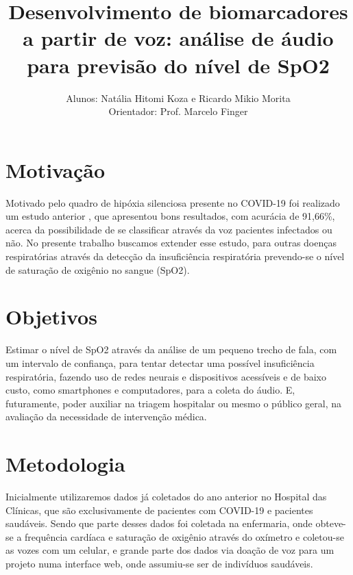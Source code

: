 \documentclass[12pt, a4paper]{article}
\begin{document}
\title{Desenvolvimento de biomarcadores a partir de voz: análise de áudio para previsão do nível de SpO2}

\author{Alunos: Natália Hitomi Koza e Ricardo Mikio Morita \\ Orientador: Prof. Marcelo Finger}
\maketitle

\section{Motivação}

Motivado pelo quadro de hipóxia silenciosa presente no COVID-19 foi realizado um estudo anterior \citep{casanova2021deep}, que apresentou bons resultados, com acurácia de 91,66\%, acerca da possibilidade de se classificar através da voz pacientes infectados ou não. No presente trabalho buscamos extender esse estudo, para outras doenças respiratórias através da detecção da insuficiência respiratória prevendo-se o nível de saturação de oxigênio no sangue (SpO2).


\section{Objetivos}

Estimar o nível de SpO2 através da análise de um pequeno trecho de fala, com um intervalo de confiança, para tentar detectar uma possível insuficiência respiratória, fazendo uso de redes neurais e dispositivos acessíveis e de baixo custo, como smartphones e computadores, para a coleta do áudio. E, futuramente, poder auxiliar na triagem hospitalar ou mesmo o público geral, na avaliação da necessidade de intervenção médica.

\section{Metodologia}

Inicialmente utilizaremos dados já coletados do ano anterior no Hospital das Clínicas, que são exclusivamente de pacientes com COVID-19 e pacientes saudáveis. Sendo que parte desses dados foi coletada na enfermaria, onde obteve-se a frequência cardíaca e saturação de oxigênio através do oxímetro e coletou-se as vozes com um celular, e grande parte dos dados via doação de voz para um projeto numa interface web, onde assumiu-se ser de indivíduos saudáveis.
\end{document}
